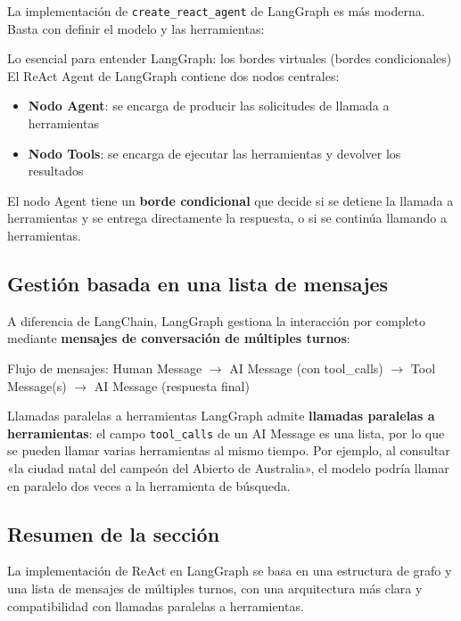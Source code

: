 \documentclass[a4paper]{article}
\begin{document}
La implementación de \texttt{create\_react\_agent} de LangGraph es más moderna. Basta con definir el modelo y las herramientas:

\begin{importantbox}{Lo esencial para entender LangGraph: los bordes virtuales (bordes condicionales)}
El ReAct Agent de LangGraph contiene dos nodos centrales:
\begin{itemize}
    \item \textbf{Nodo Agent}: se encarga de producir las solicitudes de llamada a herramientas
    \item \textbf{Nodo Tools}: se encarga de ejecutar las herramientas y devolver los resultados
\end{itemize}
El nodo Agent tiene un \textbf{borde condicional} que decide si se detiene la llamada a herramientas y se entrega directamente la respuesta, o si se continúa llamando a herramientas.
\end{importantbox}

\subsection{Gestión basada en una lista de mensajes}

A diferencia de LangChain, LangGraph gestiona la interacción por completo mediante \textbf{mensajes de conversación de múltiples turnos}:

Flujo de mensajes: Human Message $\rightarrow$ AI Message (con tool\_calls) $\rightarrow$ Tool Message(s) $\rightarrow$ AI Message (respuesta final)

\begin{knowledgebox}{Llamadas paralelas a herramientas}
LangGraph admite \textbf{llamadas paralelas a herramientas}: el campo \texttt{tool\_calls} de un AI Message es una lista, por lo que se pueden llamar varias herramientas al mismo tiempo. Por ejemplo, al consultar «la ciudad natal del campeón del Abierto de Australia», el modelo podría llamar en paralelo dos veces a la herramienta de búsqueda.
\end{knowledgebox}

\subsection{Resumen de la sección}
La implementación de ReAct en LangGraph se basa en una estructura de grafo y una lista de mensajes de múltiples turnos, con una arquitectura más clara y compatibilidad con llamadas paralelas a herramientas.
\end{document}

